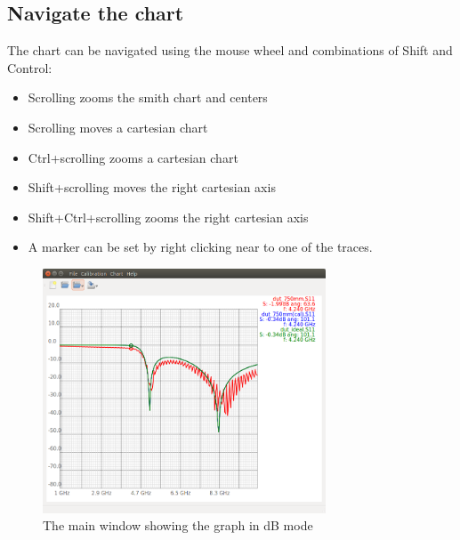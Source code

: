 \subsection{Navigate the chart}
The chart can be navigated using the mouse wheel and combinations of Shift and Control:
\begin{itemize}
\item    Scrolling zooms the smith chart and centers
\item    Scrolling moves a cartesian chart
\item    Ctrl+scrolling zooms a cartesian chart
\item    Shift+scrolling moves the right cartesian axis
\item    Shift+Ctrl+scrolling zooms the right cartesian axis
\item    A marker can be set by right clicking near to one of the traces.
\end{itemize}
\begin{figure}[H]
	\centering
	\includegraphics[width=0.75\textwidth]{figures/screenshot2.png}
	\caption{The main window showing the graph in dB mode}
	\label{fig:dbchart}
\end{figure}
\newpage
